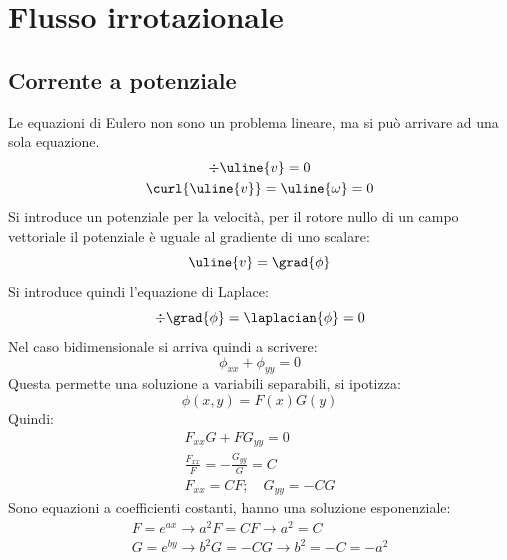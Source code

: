 %
\section{Flusso irrotazionale}
\subsection{Corrente a potenziale}
Le equazioni di Eulero non sono un problema lineare, ma si può arrivare ad una sola equazione.
%
	\begin{equation*}
		\begin{gathered}
			\div{\uline{v}} = 0\\
			\curl{\uline{v}} = \uline{\omega} = 0
		\end{gathered}
	\end{equation*}
%
Si introduce un potenziale per la velocità, per il rotore nullo di un campo vettoriale il potenziale è uguale al gradiente di uno scalare:
%
	\begin{equation*}
		\uline{v} = \grad{\phi}
	\end{equation*}
%
Si introduce quindi l'equazione di Laplace:
%
	\begin{equation*}
		\div{\grad{\phi}} = \laplacian{\phi} = 0
	\end{equation*}
%
Nel caso bidimensionale si arriva quindi a scrivere:
%
	\begin{equation*}
		\phi_{xx} + \phi_{yy} = 0
	\end{equation*}
%
Questa permette una soluzione a variabili separabili, si ipotizza:
%
	\begin{equation*}
		\phi(x,y) = F(x) G(y)
	\end{equation*}
%
Quindi:
%
	\begin{equation*}
		\begin{gathered}
			F_{xx} G + F G_{yy} = 0\\
			\frac{F_{xx}}{F} = - \frac{G_{yy}}{G} = C\\
			F_{xx} = CF; \quad G_{yy} = - CG
		\end{gathered}
	\end{equation*}
%
Sono equazioni a coefficienti costanti, hanno una soluzione esponenziale:
%
	\begin{equation*}
		\begin{gathered}
			F = e^{ax} \rightarrow a^2 F = C F \rightarrow a^2 = C\\
			G = e^{by} \rightarrow b^2 G = - C G \rightarrow b^2 = -C = -a^2
		\end{gathered}
	\end{equation*}
